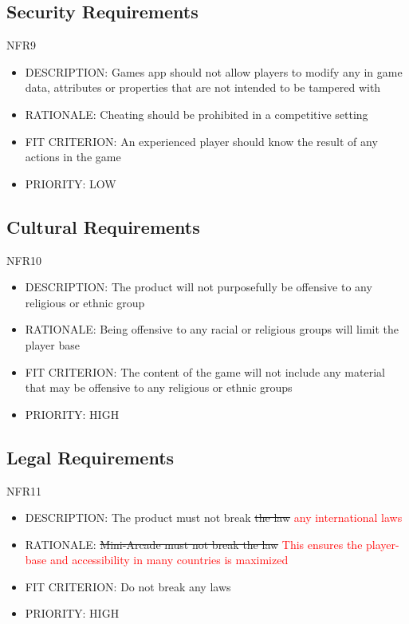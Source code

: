 \documentclass[12pt, titlepage]{article}
\begin{document}
\subsection{Security Requirements}
NFR9
\begin{itemize}
    \item DESCRIPTION: Games app should not allow players to modify any in game data, attributes or properties 
that are not intended to be tampered with
    \item RATIONALE:  Cheating should be prohibited in a competitive setting
    \item FIT CRITERION: An experienced player should know the result of any actions in the game
    \item PRIORITY: LOW
\end{itemize}

\subsection{Cultural Requirements}
NFR10
\begin{itemize}
    \item DESCRIPTION: The product will not purposefully be offensive to any religious or ethnic group
    \item RATIONALE: Being offensive to any racial or religious groups will limit the player base
    \item FIT CRITERION: The content of the game will not include any material that may be offensive to any religious or ethnic groups
    \item PRIORITY: HIGH
\end{itemize}
\subsection{Legal Requirements}
NFR11
\begin{itemize}
    \item DESCRIPTION: The product must not break \sout{the law} \textcolor{red}{any international laws}
    \item RATIONALE: \sout{Mini-Arcade must not break the law} \textcolor{red}{This ensures the player-base and accessibility in many countries is maximized}
    \item FIT CRITERION: Do not break any laws
    \item PRIORITY: HIGH
\end{itemize}
\end{document}
